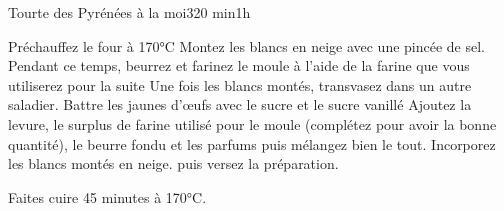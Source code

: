 {\begin{recette}{Tourte des Pyrénées à la moi}{3}{20 min}{1h}
\begin{preparation}
\etape Préchauffez le four à 170°C
\etape Montez les blancs en neige avec une pincée de sel. 
\etape Pendant ce temps, beurrez et farinez le moule à l'aide de la farine que vous utiliserez pour la suite
\etape Une fois les blancs montés, transvasez dans un autre saladier.
\etape Battre les jaunes d'œufs avec le sucre et le sucre vanillé
\etape Ajoutez la levure, le surplus de farine utilisé pour le moule (complétez pour avoir la bonne quantité), le beurre fondu et les parfums puis mélangez bien le tout.
\etape Incorporez les blancs montés en neige.
\etape puis versez la préparation.
\end{preparation}

\begin{cuisson}
Faites cuire 45 minutes à 170°C.
\end{cuisson}
\end{recette}


}%
